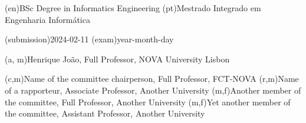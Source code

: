 \ntauthordegree(en){BSc Degree in Informatics Engineering}
\ntauthordegree(pt){Mestrado Integrado em Engenharia Informática}

\ntdate(submission){2024-02-11} 
\ntdate(exam){year-month-day}

(a, m){Henrique João, Full Professor, NOVA University Lisbon}

(c,m){Name of the committee chairperson, Full Professor, FCT-NOVA}
(r,m){Name of a rapporteur, Associate Professor, Another University}
(m,f){Another member of the committee, Full Professor, Another University}
(m,f){Yet another member of the committee, Assistant Professor, Another University}
